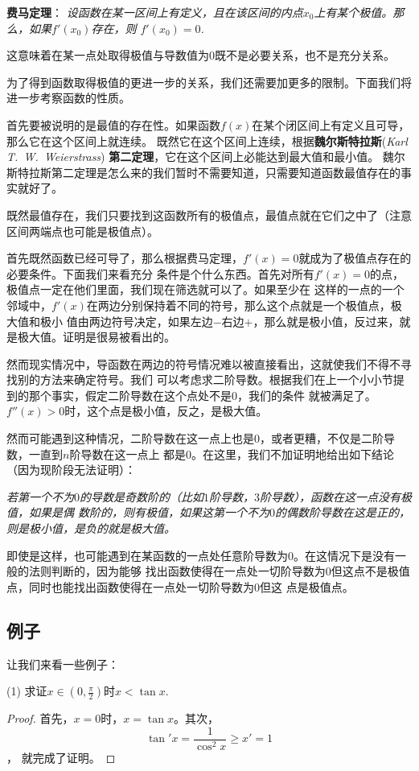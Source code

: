 \textbf{费马定理}：
\emph{设函数在某一区间上有定义，且在该区间的内点$x_0$上有某个极值。那么，如果$f'(x_0)$存在，则
$f'(x_0)=0$.}

这意味着在某一点处取得极值与导数值为0既不是必要关系，也不是充分关系。

为了得到函数取得极值的更进一步的关系，我们还需要加更多的限制。下面我们将进一步考察函数的性质。

首先要被说明的是最值的存在性。如果函数$f(x)$在某个闭区间上有定义且可导，那么它在这个区间上就连续。
既然它在这个区间上连续，根据\textbf{魏尔斯特拉斯}(\emph{Karl T.~W.~Weierstrass})
\textbf{第二定理}，它在这个区间上必能达到最大值和最小值。
魏尔斯特拉斯第二定理是怎么来的我们暂时不需要知道，只需要知道函数最值存在的事实就好了。

既然最值存在，我们只要找到这函数所有的极值点，最值点就在它们之中了（注意区间两端点也可能是极值点）。

首先既然函数已经可导了，那么根据费马定理，$f'(x)=0$就成为了极值点存在的必要条件。下面我们来看充分
条件是个什么东西。首先对所有$f'(x)=0$的点，极值点一定在他们里面，我们现在筛选就可以了。如果至少在
这样的一点的一个邻域中，$f'(x)$在两边分别保持着不同的符号，那么这个点就是一个极值点，极大值和极小
值由两边符号决定，如果左边$-$右边$+$，那么就是极小值，反过来，就是极大值。证明是很易被看出的。

然而现实情况中，导函数在两边的符号情况难以被直接看出，这就使我们不得不寻找别的方法来确定符号。我们
可以考虑求二阶导数。根据我们在上一个小小节提到的那个事实，假定二阶导数在这个点处不是0，我们的条件
就被满足了。$f''(x)>0$时，这个点是极小值，反之，是极大值。

然而可能遇到这种情况，二阶导数在这一点上也是0，或者更糟，不仅是二阶导数，一直到$n$阶导数在这一点上
都是0。在这里，我们不加证明地给出如下结论（因为现阶段无法证明）：

\emph{若第一个不为$0$的导数是奇数阶的（比如$1$阶导数，$3$阶导数），函数在这一点没有极值，如果是偶
数阶的，则有极值，如果这第一个不为$0$的偶数阶导数在这是正的，则是极小值，是负的就是极大值。}

即使是这样，也可能遇到在某函数的一点处任意阶导数为0。在这情况下是没有一般的法则判断的，因为能够
找出函数使得在一点处一切阶导数为0但这点不是极值点，同时也能找出函数使得在一点处一切阶导数为0但这
点是极值点。

\subsection{例子}
让我们来看一些例子：

(1) 求证$x \in (0,\frac{\pi}{2})$时$x < \tan{x}$.
\begin{proof}
首先，$x=0$时，$x=\tan{x}$。其次，
\[
\tan'{x} = \frac{1}{\cos^2{x}} \geq x' = 1
\]，
就完成了证明。
\end{proof}

